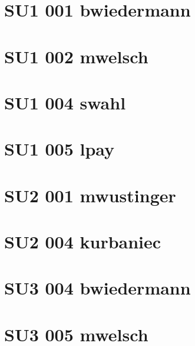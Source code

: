 \documentclass{article}
\begin{document}
\section{SU1 001 bwiedermann}


\section{SU1 002 mwelsch}



\section{SU1 004 swahl}


\section{SU1 005 lpay}





\section{SU2 001 mwustinger}




\section{SU2 004 kurbaniec}






\section{SU3 004 bwiedermann}


\section{SU3 005 mwelsch}

\end{document}
